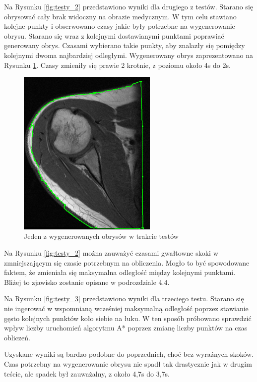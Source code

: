 \documentclass[a4paper,11pt,twoside,openright]{report}
\theoremstyle{definition}
\begin{document}
Na Rysunku \ref{fig:testy_2} przedstawiono wyniki dla drugiego z testów. Starano się obrysować cały brak widoczny na obrazie medycznym. W tym celu stawiano kolejne punkty i obserwowano czasy jakie były potrzebne na wygenerowanie obrysu. Starano się wraz z kolejnymi dostawianymi punktami poprawiać generowany obrys. Czasami wybierano takie punkty, aby znalazły się pomiędzy kolejnymi dwoma najbardziej odległymi. Wygenerowany obrys zaprezentowano na Rysunku \ref{fig:108}. Czasy zmieniły się prawie 2 krotnie, z poziomu około 4s do 2s.

\begin{figure}[h!]
	\center
	\includegraphics[width=0.6\textwidth]{108}
	\caption{Jeden z wygenerowanych obrysów w trakcie testów}
    	\label{fig:108}
\end{figure}


Na Rysunku \ref{fig:testy_2} można zauważyć czasami gwałtowne skoki w zmniejszającym się czasie potrzebnym na obliczenia. Mogło to być spowodowane faktem, że zmieniała się maksymalna odległość między kolejnymi punktami. Bliżej to zjawisko zostanie opisane w podrozdziale 4.4.

Na Rysunku \ref{fig:testy_3} przedstawiono wyniki dla trzeciego testu. Starano się nie ingerować w wspomnianą wcześniej maksymalną odległość poprzez stawianie gęsto kolejnych punktów koło siebie na łuku. W ten sposób próbowano sprawdzić wpływ liczby uruchomień algorytmu A* poprzez zmianę liczby punktów na czas obliczeń.

Uzyskane wyniki są bardzo podobne do poprzednich, choć bez wyraźnych skoków. Czas potrzebny na wygenerowanie obrysu nie spadł tak drastycznie jak w drugim teście, ale spadek był zauważalny, z około 4,7s do 3,7s.
\end{document}
